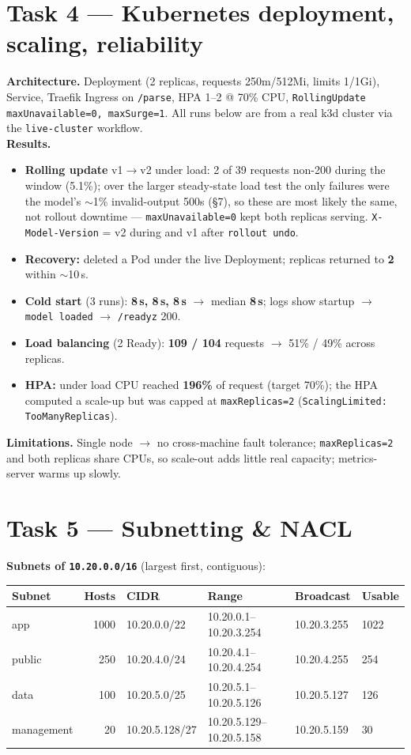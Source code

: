\documentclass[10pt,a4paper]{article}
\newcommand{\code}[1]{\texttt{\small #1}}
\begin{document}
\section{Task 4 --- Kubernetes deployment, scaling, reliability}
\textbf{Architecture.} Deployment (2 replicas, requests 250m/512Mi, limits 1/1Gi), Service, Traefik Ingress
on \code{/parse}, HPA 1--2 @ 70\% CPU, \code{RollingUpdate maxUnavailable=0, maxSurge=1}. All runs below are
from a real k3d cluster via the \code{live-cluster} workflow.\\
\textbf{Results.}
\begin{itemize}
\item \textbf{Rolling update} v1$\rightarrow$v2 under load: 2 of 39 requests non-200 during the window
(5.1\%); over the larger steady-state load test the only failures were the model's $\sim$1\% invalid-output
500s (\S7), so these are most likely the same, not rollout downtime --- \code{maxUnavailable=0} kept both
replicas serving. \code{X-Model-Version} = v2 during and v1 after \code{rollout undo}.
\item \textbf{Recovery:} deleted a Pod under the live Deployment; replicas returned to \textbf{2} within
$\sim$10\,s.
\item \textbf{Cold start} (3 runs): \textbf{8\,s, 8\,s, 8\,s} $\rightarrow$ median \textbf{8\,s}; logs show
startup $\rightarrow$ \code{model loaded} $\rightarrow$ \code{/readyz} 200.
\item \textbf{Load balancing} (2 Ready): \textbf{109 / 104} requests $\rightarrow$ 51\% / 49\% across replicas.
\item \textbf{HPA:} under load CPU reached \textbf{196\%} of request (target 70\%); the HPA computed a
scale-up but was capped at \code{maxReplicas=2} (\code{ScalingLimited: TooManyReplicas}).
\end{itemize}
\textbf{Limitations.} Single node $\rightarrow$ no cross-machine fault tolerance; \code{maxReplicas=2} and
both replicas share CPUs, so scale-out adds little real capacity; metrics-server warms up slowly.

\section{Task 5 --- Subnetting \& NACL}
\textbf{Subnets of \code{10.20.0.0/16}} (largest first, contiguous):

\begin{center}\small
\begin{tabular}{lrllll}
\toprule
Subnet & Hosts & CIDR & Range & Broadcast & Usable \\
\midrule
app & 1000 & 10.20.0.0/22 & 10.20.0.1--10.20.3.254 & 10.20.3.255 & 1022 \\
public & 250 & 10.20.4.0/24 & 10.20.4.1--10.20.4.254 & 10.20.4.255 & 254 \\
data & 100 & 10.20.5.0/25 & 10.20.5.1--10.20.5.126 & 10.20.5.127 & 126 \\
management & 20 & 10.20.5.128/27 & 10.20.5.129--10.20.5.158 & 10.20.5.159 & 30 \\
\bottomrule
\end{tabular}
\end{center}
\end{document}
